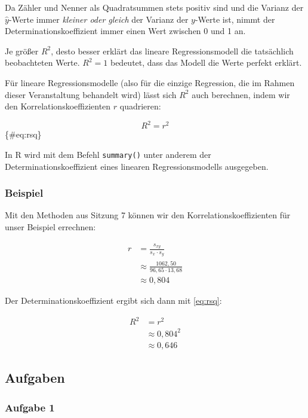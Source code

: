 \documentclass[
  ngerman,
]{article}
\begin{document}
Da Zähler und Nenner als Quadratsummen stets positiv sind und die Varianz der \(\hat{y}\)-Werte immer \emph{kleiner oder gleich} der Varianz der \(y\)-Werte ist, nimmt der Determinationskoeffizient immer einen Wert zwischen 0 und 1 an.

Je größer \(R^2\), desto besser erklärt das lineare Regressionsmodell die tatsächlich beobachteten Werte. \(R^2=1\) bedeutet, dass das Modell die Werte perfekt erklärt.

Für lineare Regressionsmodelle (also für die einzige Regression, die im Rahmen dieser Veranstaltung behandelt wird) lässt sich \(R^2\) auch berechnen, indem wir den Korrelationskoeffizienten \(r\) quadrieren:

\[
R^2=r^2
\]\{\#eq:rsq\}

\begin{rtip}
In R wird mit dem Befehl {\tt summary()} unter anderem der Determinationskoeffizient eines linearen Regressionsmodells ausgegeben.
\end{rtip}

\hypertarget{beispiel-28}{%
\subsubsection{Beispiel}\label{beispiel-28}}

Mit den Methoden aus Sitzung 7 können wir den Korrelationskoeffizienten für unser Beispiel errechnen:

\[\begin{aligned}
r&=\frac{s_{xy}}{s_x\cdot s_y}\\[6pt]
&\approx\frac{1062,50}{96,65\cdot13,68}\\[4pt]
&\approx0,804
\end{aligned}\]

Der Determinationskoeffizient ergibt sich dann mit \autoref{eq:rsq}:

\[\begin{aligned}
R^2&=r^2\\
&\approx 0,804^2\\
&\approx 0,646
\end{aligned}\]

\hypertarget{aufgaben-7}{%
\subsection{Aufgaben}\label{aufgaben-7}}

\hypertarget{aufgabe-1-7}{%
\subsubsection{Aufgabe 1}\label{aufgabe-1-7}}
\end{document}
